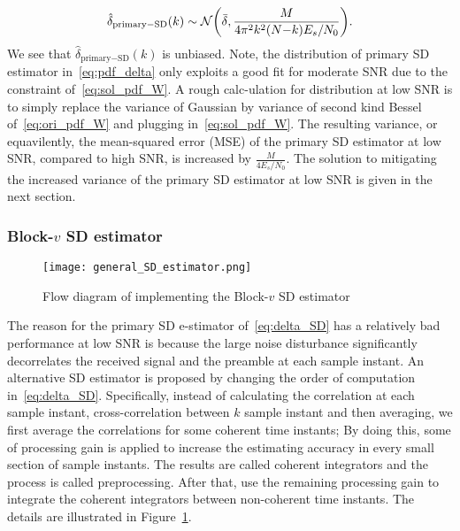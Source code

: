 \begin{equation}
    \label{eq:pdf_delta}
        \hat{\delta}_{\text{primary}-\text{SD}}(k) \sim \mathcal{N} \bigg(\bar{\delta},\frac{M}{4\pi^2k^2(N{-}k)E_s/N_0}\bigg).
  \end{equation}  
We see that $\hat{\delta}_{\text{primary}-\text{SD}}(k)$ is unbiased. 
Note, the distribution of primary SD estimator in~\eqref{eq:pdf_delta} only exploits a good fit for moderate SNR due to
the constraint of~\eqref{eq:sol_pdf_W}. A rough calc-ulation for distribution 
at low SNR is to simply replace the variance of Gaussian by variance of second kind Bessel
of~\eqref{eq:ori_pdf_W} and plugging in~\eqref{eq:sol_pdf_W}.
The resulting variance, or equavilently, the mean-squared error (MSE) of the primary SD estimator at low SNR, 
compared to high SNR, is increased by $\frac{M}{4E_s/N_0}$.
The solution to mitigating the increased variance of the primary SD estimator at low SNR
is given in the next section.

\subsubsection{Block-$v$ SD estimator}

\begin{figure}[t]
  \centerline{\texttt{[image: general\_SD\_estimator.png]}}
  \caption{Flow diagram of implementing the Block-$v$ SD estimator}
  \label{fig:general_SD_estimator}
  \end{figure}

The reason for the primary SD e-stimator of~\eqref{eq:delta_SD} has a relatively bad performance at low SNR is because the large noise
disturbance significantly decorrelates the received signal and the preamble at each sample instant.
An alternative SD estimator is proposed by changing the order of computation in~\eqref{eq:delta_SD}.
Specifically, 
instead of calculating the correlation at each sample instant, 
cross-correlation between $k$ sample instant and then averaging, 
we first average the correlations for some coherent time instants; 
By doing this, some of processing gain is applied to increase the estimating accuracy in every small section of sample instants.
The results are called coherent integrators and the process is called preprocessing.
After that, use the remaining processing gain to integrate 
the coherent integrators between non-coherent time instants.
The details are illustrated in Figure~\ref{fig:general_SD_estimator}. 

